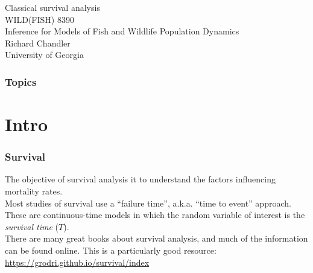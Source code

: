 \documentclass[color=usenames,dvipsnames]{beamer}\usepackage[]{graphicx}\usepackage[]{xcolor}
\begin{document}
\begin{frame}[plain]
  \centering
  \huge %
  Classical survival analysis \\
  \vfill
  \large
  WILD(FISH) 8390 \\
  Inference for Models of Fish and Wildlife Population Dynamics \\
  \vfill
  Richard Chandler \\
  University of Georgia \\
\end{frame}







\begin{frame}[plain]
  \frametitle{Topics}
  \Large
\end{frame}




\section{Intro}





\begin{frame}
  \frametitle{Survival}
  \large
  The objective of survival analysis it to understand the factors
  influencing mortality rates. \\
  \pause
  \vfill
  Most studies of survival use a ``failure time'', a.k.a. ``time to event''
  approach. \\ 
  \pause
  \vfill
  These are continuous-time models in which the random variable of
  interest is the {\it survival time} ($T$). \\
  \pause
  \vfill
  There are many great books about survival analysis, and much of the
  information can be found online. This is a particularly good
  resource: \\
  \vfill
  \centering
  \color{blue} \url{
    https://grodri.github.io/survival/index
  } \\
\end{frame}
\end{document}
